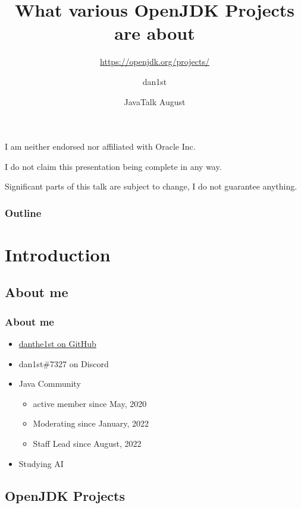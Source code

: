 \documentclass{beamer}
\title{What various OpenJDK Projects are about}
\subtitle{\href{https://openjdk.org/projects/}{https://openjdk.org/projects/}}
\author{dan1st}
\date{JavaTalk August}%
\begin{document}
\begin{frame}
\frametitle{}
\titlepage
\end{frame}

\begin{frame}
I am neither endorsed nor affiliated with Oracle Inc.

I do not claim this presentation being complete in any way.

Significant parts of this talk are subject to change, I do not guarantee anything.
\end{frame}

\begin{frame}
\frametitle{Outline}
\tableofcontents
\end{frame}

\section{Introduction}

\subsection[About me]{About me}
\begin{frame}

\frametitle{About me}

\begin{itemize}
  \item \href{https://github.com/danthe1st}{danthe1st on GitHub}
  \item dan1st\#7327 on Discord
  \item Java Community
  \begin{itemize}
	  \item active member since May, 2020
	  \item Moderating since January, 2022
	  \item Staff Lead since August, 2022
	\end{itemize}
  \item Studying AI
\end{itemize}
\end{frame}

\subsection{OpenJDK Projects}
\end{document}
